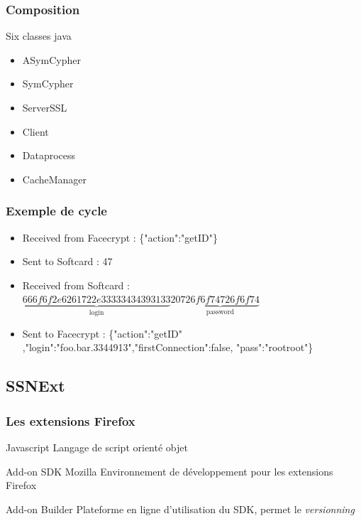 \documentclass{beamer}
\begin{document}
\begin{frame}
    \frametitle{Composition}
    \begin{block}{Six classes java}
        \begin{itemize}
            \item ASymCypher
            \item SymCypher
            \item ServerSSL
            \item Client
            \item Dataprocess
            \item CacheManager
        \end{itemize}
    \end{block}
\end{frame}

\begin{frame}
    \frametitle{Exemple de cycle}

    \begin{itemize}
        \item Received from Facecrypt : \{"action":"getID"\}
        \item Sent to Softcard : 47
        \item Received from Softcard : $\underbrace{666f6f2e6261722e33333434393133}_{\textrm{login}} 20 \underbrace{726f6f74726f6f74}_{\textrm{password}}$
        \item Sent to Facecrypt : \{"action":"getID" ,"login":"foo.bar.3344913","firstConnection":false, "pass":"rootroot"\}
    \end{itemize}

\end{frame}

\subsection{SSNExt}

\begin{frame}
    \frametitle{Les extensions Firefox}
    \begin{block}{Javascript} 
    Langage de script orienté objet
    \end{block}
    \begin{block}{Add-on SDK Mozilla}
    Environnement de développement pour les extensions Firefox
    \end{block}
    \begin{block}{Add-on Builder}
    Plateforme en ligne d'utilisation du SDK, permet le \emph{versionning}
    \end{block}
\end{frame}
\end{document}
